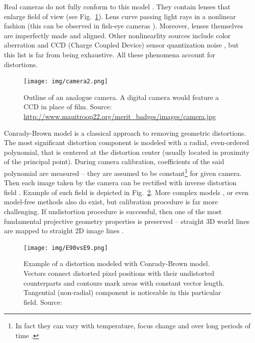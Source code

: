 Real cameras do not fully conform to this model \cite{szczesny}. They contain lenses that enlarge field of view (see Fig.~\ref{fig:analogue}). Lens curve passing light rays in a nonlinear fashion (this can be observed in fish-eye cameras \cite{fisheye_endoscopy}). Moreover, lenses themselves are imperfectly made and aligned. Other nonlinearlity sources include color aberration and CCD (Charge Coupled Device) sensor quantization noise \cite{heikkla14}, but this list is far from being exhaustive. All these phenomena account for distortions.

\begin{figure}[ht]
	\centering\texttt{[image: img/camera2.png]}
	\caption{Outline of an analogue camera. A digital camera would feature a CCD in place of film. Source: \url{ http://www.mauitroop22.org/merit_badges/images/camera.jpg} }
	\label{fig:analogue}
\end{figure}

Conrady-Brown model \cite{brown8} \cite{Zhang_flexible} is a classical approach to removing geometric distortions. The most significant distortion component is modeled with a radial, even-ordered polynomial, that is centered at the distortion center (usually located in proximity of the principal point). During camera calibration, coefficients of the said polynomial are measured -- they are assumed to be constant\footnote{In fact they can vary with temperature, focus change and over long periods of time \cite{google_calibration}.} for given camera. Then each image taken by the camera can be rectified with inverse distortion field \cite{opencv}. Example of such field is depicted in Fig.~\ref{fig:brown}. More complex models \cite{simultaneous}, or even model-free methods \cite{towards} \cite{parameterfree} also do exist, but calibration procedure is far more challenging. If undistortion procedure is successful, then one of the most fundamental projective geometry properties is preserved -- straight 3D world lines are mapped to straight 2D image lines \cite{straight}.

\begin{figure}[ht]
	\centering\texttt{[image: img/E90vsE9.png]}
	\caption{Example of a distortion modeled with Conrady-Brown model. Vectors connect distorted pixel positions with their undistorted counterparts and contours mark areas with constant vector length. Tangential (non-radial) component is noticeable in this particular field. Source: \cite{szczesny} }
	\label{fig:brown}
\end{figure}



